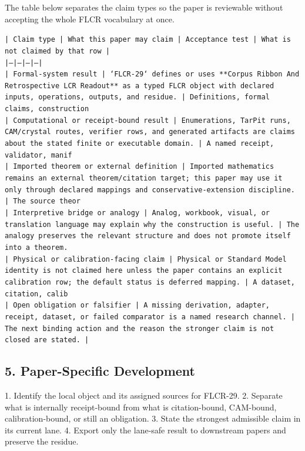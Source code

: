 \documentclass[11pt]{article}
\begin{document}
The table below separates the claim types so the paper is reviewable without accepting the whole FLCR vocabulary at once.

\noindent\texttt{| Claim type | What this paper may claim | Acceptance test | What is not claimed by that row |}\\
\noindent\texttt{|---|---|---|---|}\\
\noindent\texttt{| Formal-system result | `FLCR-29` defines or uses **Corpus Ribbon And Retrospective LCR Readout** as a typed FLCR object with declared inputs, operations, outputs, and residue. | Definitions, formal claims, construction}\\
\noindent\texttt{| Computational or receipt-bound result | Enumerations, TarPit runs, CAM/crystal routes, verifier rows, and generated artifacts are claims about the stated finite or executable domain. | A named receipt, validator, manif}\\
\noindent\texttt{| Imported theorem or external definition | Imported mathematics remains an external theorem/citation target; this paper may use it only through declared mappings and conservative-extension discipline. | The source theor}\\
\noindent\texttt{| Interpretive bridge or analogy | Analog, workbook, visual, or translation language may explain why the construction is useful. | The analogy preserves the relevant structure and does not promote itself into a theorem. }\\
\noindent\texttt{| Physical or calibration-facing claim | Physical or Standard Model identity is not claimed here unless the paper contains an explicit calibration row; the default status is deferred mapping. | A dataset, citation, calib}\\
\noindent\texttt{| Open obligation or falsifier | A missing derivation, adapter, receipt, dataset, or failed comparator is a named research channel. | The next binding action and the reason the stronger claim is not closed are stated. | }\\

\subsection*{5. Paper-Specific Development}

1. Identify the local object and its assigned sources for FLCR-29.
2. Separate what is internally receipt-bound from what is citation-bound, CAM-bound, calibration-bound, or still an obligation.
3. State the strongest admissible claim in its current lane.
4. Export only the lane-safe result to downstream papers and preserve the residue.
\end{document}
